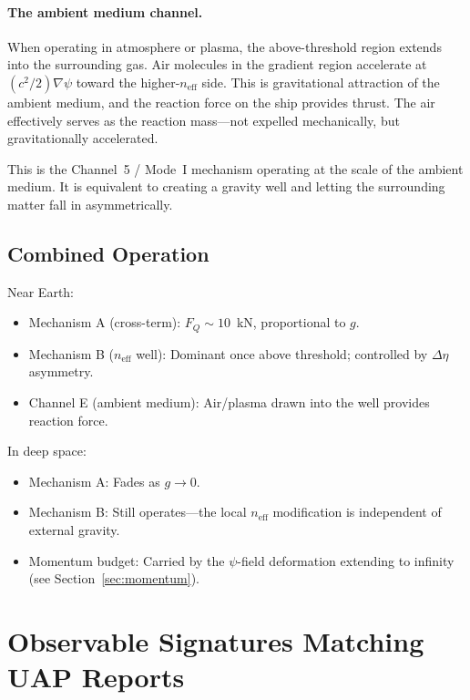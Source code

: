 \documentclass[12pt,aps,prd,superscriptaddress,nofootinbib,longbibliography]{revtex4-2}
\newcommand{\neff}{n_{\mathrm{eff}}}
\begin{document}
\paragraph{The ambient medium channel.}
When operating in atmosphere or plasma, the above-threshold region extends
into the surrounding gas.  Air molecules in the gradient region accelerate
at $(c^2/2)\nabla\psi$ toward the higher-$\neff$ side.  This is
gravitational attraction of the ambient medium, and the reaction force
on the ship provides thrust.  The air effectively serves as the reaction
mass---not expelled mechanically, but gravitationally accelerated.

This is the Channel~5 / Mode~I mechanism operating at the scale of the
ambient medium.  It is equivalent to creating a gravity well and letting
the surrounding matter fall in asymmetrically.

\subsection{Combined Operation}

Near Earth:
\begin{itemize}
\item Mechanism A (cross-term): $F_Q \sim 10$~kN, proportional to $g$.
\item Mechanism B ($\neff$ well): Dominant once above threshold;
controlled by $\Delta\eta$ asymmetry.
\item Channel E (ambient medium): Air/plasma drawn into the well provides
reaction force.
\end{itemize}

In deep space:
\begin{itemize}
\item Mechanism A: Fades as $g \to 0$.
\item Mechanism B: Still operates---the local $\neff$ modification is
independent of external gravity.
\item Momentum budget: Carried by the $\psi$-field deformation extending
to infinity (see Section~\ref{sec:momentum}).
\end{itemize}


\section{Observable Signatures Matching UAP Reports}\label{sec:uap}
\end{document}
